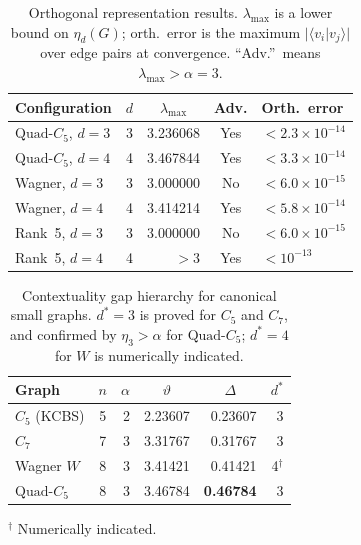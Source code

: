 \documentclass[aps,pra,twocolumn,superscriptaddress,longbibliography,floatfix]{revtex4-2}
\newcommand{\vt}{\vartheta}
\newcommand{\al}{\alpha}
\newcommand{\De}{\Delta}
\newcommand{\lmax}{\lambda_{\max}}
\newcommand{\QC}{\ensuremath{\text{Quad-}C_5}}
\begin{document}
\begin{table}[!ht]
  \caption{Orthogonal representation results.
           $\lmax$ is a lower bound on $\eta_d(G)$; orth.\ error is the
           maximum $|\langle v_i|v_j\rangle|$ over edge pairs at
           convergence.
           ``Adv.''\ means $\lmax>\al=3$.}
  \label{tab:orth_reps}
  \begin{ruledtabular}
  \scriptsize
  \begin{tabular}{lrrcl}
    Configuration &
    \multicolumn{1}{c}{$d$} &
    \multicolumn{1}{c}{$\lmax$} &
    Adv. & Orth.\ error \\
    \hline
    \QC, $d=3$ & 3 & 3.236068 & Yes & $<2.3\times10^{-14}$ \\
    \QC, $d=4$ & 4 & 3.467844 & Yes & $<3.3\times10^{-14}$ \\
    Wagner,  $d=3$ & 3 & 3.000000 & No  & $<6.0\times10^{-15}$ \\
    Wagner,  $d=4$ & 4 & 3.414214 & Yes & $<5.8\times10^{-14}$ \\
    Rank~5,  $d=3$ & 3 & 3.000000 & No  & $<6.0\times10^{-15}$ \\
    Rank~5,  $d=4$ & 4 & $>3$     & Yes & $<10^{-13}$ \\
  \end{tabular}
  \end{ruledtabular}
\end{table}
\begin{table}[!ht]
  \caption{Contextuality gap hierarchy for canonical small graphs.
           $d^*=3$ is proved for $C_5$ and $C_7$, and confirmed by
           $\eta_3>\al$ for \QC; $d^*=4$ for $W$ is numerically indicated.}
  \label{tab:hierarchy}
  \begin{ruledtabular}
  \scriptsize
  \begin{tabular}{lcrrrr}
    Graph & $n$ &
    \multicolumn{1}{c}{$\al$} &
    \multicolumn{1}{c}{$\vt$} &
    \multicolumn{1}{c}{$\De$} &
    $d^*$ \\
    \hline
    $C_5$ (KCBS)    & 5 & 2 & 2.23607 & 0.23607 & 3 \\
    $C_7$           & 7 & 3 & 3.31767 & 0.31767 & 3 \\
    Wagner $W$      & 8 & 3 & 3.41421 & 0.41421 & 4$^\dagger$ \\
    \textbf{\QC} & 8 & 3 & 3.46784 & \textbf{0.46784} & 3 \\
  \end{tabular}
  \end{ruledtabular}
  \noindent $^\dagger$ Numerically indicated.
\end{table}
\end{document}
